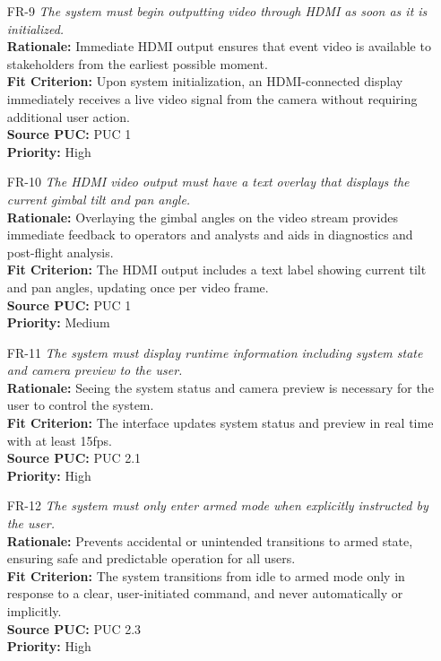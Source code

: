 \documentclass[12pt]{article}
\begin{document}
\begin{itemize}
  \item[FR-9] \emph{The system must begin outputting video through HDMI as soon as it
          is initialized.}\\[2mm]
        {\bf Rationale:} Immediate HDMI output ensures that event video is available to stakeholders from the earliest possible moment.\\
        {\bf Fit Criterion:} Upon system initialization, an HDMI-connected display immediately receives a live video signal from the camera without requiring additional user action.\\
        {\bf Source PUC:} PUC 1 \\
        {\bf Priority:} High

  \item[FR-10] \emph{The HDMI video output must have a text overlay that displays the
          current gimbal tilt and pan angle.}\\[2mm]
        {\bf Rationale:} Overlaying the gimbal angles on the video stream provides immediate feedback to operators and analysts and aids in diagnostics and post-flight analysis.\\
        {\bf Fit Criterion:} The HDMI output includes a text label showing current tilt and pan angles, updating once per video frame.\\
        {\bf Source PUC:} PUC 1 \\
        {\bf Priority:} Medium

  \item[FR-11] \emph{The system must display runtime information including system state
          and camera preview to the user.}\\[2mm]
        {\bf Rationale:} Seeing the system status and camera preview is necessary for the user to control the system.\\
        {\bf Fit Criterion:} The interface updates system status and preview in real time with at least 15fps.\\
        {\bf Source PUC:} PUC 2.1 \\
        {\bf Priority:} High

  \item[FR-12] \emph{The system must only enter armed mode when explicitly instructed
          by the user.}\\[2mm]
        {\bf Rationale:} Prevents accidental or unintended transitions to armed state, ensuring safe and predictable operation for all users.\\
        {\bf Fit Criterion:} The system transitions from idle to armed mode only in response to a clear, user-initiated command, and never automatically or implicitly.\\
        {\bf Source PUC:} PUC 2.3 \\
        {\bf Priority:} High


\end{itemize}
\end{document}
